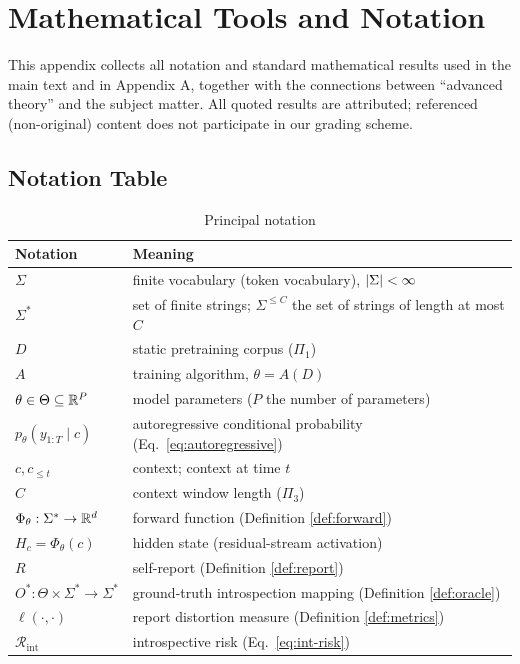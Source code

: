 \section{Mathematical Tools and Notation}

This appendix collects all notation and standard mathematical results used in the main text
and in Appendix A, together with the connections between ``advanced theory'' and the subject
matter. All quoted results are attributed; referenced (non-original) content does not
participate in our grading scheme.

\subsection{Notation Table}

\begin{table}[htbp]
\centering
\caption{Principal notation\label{tab:notation}}
\begin{tabular}{ll}
\toprule
Notation & Meaning \\
\midrule
$\Sigma$ & finite vocabulary (token vocabulary), $\left\lvert \Sigma \right\rvert < \infty$ \\
$\Sigma^{*}$ & set of finite strings; $\Sigma^{\le C}$ the set of strings of length at most $C$ \\
$D$ & static pretraining corpus ($\Pi_1$) \\
$A$ & training algorithm, $\theta = A(D)$ \\
$\theta \in \Theta \subseteq \mathbb{R}^{P}$ & model parameters ($P$ the number of parameters) \\
$p_\theta(y_{1:T}\mid c)$ & autoregressive conditional probability (Eq.~\eqref{eq:autoregressive}) \\
$c, c_{\le t}$ & context; context at time $t$ \\
$C$ & context window length ($\Pi_3$) \\
$\Phi_\theta: \Sigma^{*} \to \mathbb{R}^{d}$ & forward function (Definition \ref{def:forward}) \\
$H_c = \Phi_\theta(c)$ & hidden state (residual-stream activation) \\
$R$ & self-report (Definition \ref{def:report}) \\
$O^{*}: \Theta \times \Sigma^{*} \to \Sigma^{*}$ & ground-truth introspection mapping (Definition \ref{def:oracle}) \\
$\ell(\cdot,\cdot)$ & report distortion measure (Definition \ref{def:metrics}) \\
$\mathcal{R}_{\mathrm{int}}$ & introspective risk (Eq.~\eqref{eq:int-risk}) \\

\end{tabular}
\end{table}
